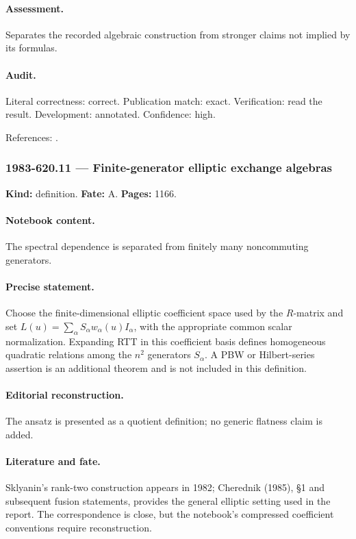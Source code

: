 \paragraph{Assessment.} Separates the recorded algebraic construction from stronger claims not implied by its formulas.

\paragraph{Audit.} Literal correctness: correct. Publication match: exact. Verification: read the result. Development: annotated. Confidence: high.

\noindent References: \citep{cherednik1985finite}.\par

\subsubsection{1983-620.11 --- Finite-generator elliptic exchange algebras}

\label{item:1983-620.11}

\noindent\textbf{Kind:} definition. \textbf{Fate:} A. \textbf{Pages:} 1166.\par

\paragraph{Notebook content.} The spectral dependence is separated from finitely many noncommuting generators.

\paragraph{Precise statement.} Choose the finite-dimensional elliptic coefficient space used by the \(R\)-matrix and set \(L(u)=\sum_\alpha S_\alpha w_\alpha(u)I_\alpha\), with the appropriate common scalar normalization. Expanding RTT in this coefficient basis defines homogeneous quadratic relations among the \(n^2\) generators \(S_\alpha\). A PBW or Hilbert-series assertion is an additional theorem and is not included in this definition.

\paragraph{Editorial reconstruction.} The ansatz is presented as a quotient definition; no generic flatness claim is added.

\paragraph{Literature and fate.} Sklyanin’s rank-two construction appears in 1982; Cherednik (1985), \S1 and subsequent fusion statements, provides the general elliptic setting used in the report. The correspondence is close, but the notebook’s compressed coefficient conventions require reconstruction.

